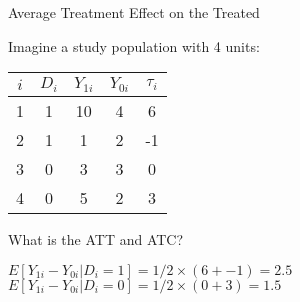 \documentclass{beamer}
\numberwithin{equation}{section}
\begin{document}
\begin{frame}{Average Treatment Effect on the Treated}

Imagine a study population with 4 units:

\begin{table}[ht]
    \centering
    \begin{tabular}{c  c c c c }
      $i$ & $D_i$ & $Y_{1i}$ & $Y_{0i}$ & $\tau_i$ \\ \hline
      1  & 1 & 10  & 4 & 6 \\
      2  & 1 & 1  & 2 & -1 \\
      3 & 0 & 3 & 3 & 0 \\
      4 & 0 & 5 & 2 & 3 \\
    \end{tabular}
    \end{table}
    
    \medskip

What is the ATT and ATC?\medskip

\pause

$E[Y_{1i} - Y_{0i} | D_i = 1] = 1/2 \times (6 + -1) = 2.5$\\\medskip
$E[Y_{1i} - Y_{0i} | D_i  = 0] = 1/2 \times (0 + 3) = 1.5$

\end{frame}

%
%
%
\end{document}
